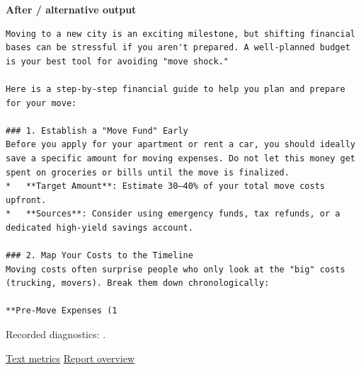 \textbf{After / alternative output}

\begin{Verbatim}
Moving to a new city is an exciting milestone, but shifting financial bases can be stressful if you aren't prepared. A well-planned budget is your best tool for avoiding "move shock."

Here is a step-by-step financial guide to help you plan and prepare for your move:

### 1. Establish a "Move Fund" Early
Before you apply for your apartment or rent a car, you should ideally save a specific amount for moving expenses. Do not let this money get spent on groceries or bills until the move is finalized.
*   **Target Amount**: Estimate 30–40% of your total move costs upfront.
*   **Sources**: Consider using emergency funds, tax refunds, or a dedicated high-yield savings account.

### 2. Map Your Costs to the Timeline
Moving costs often surprise people who only look at the "big" costs (trucking, movers). Break them down chronologically:

**Pre-Move Expenses (1
\end{Verbatim}

Recorded diagnostics:
\texttt{}.

\href{records/docs/watermarking/text.tex}{Text metrics} \textbar{}
\href{../docs/watermarking/README.md}{Report overview}
